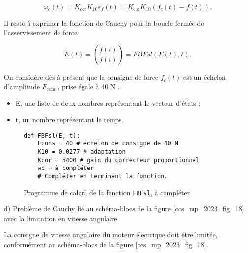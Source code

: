 $$
\omega_{c}(t)=K_{\operatorname{cor}} K_{10} \varepsilon_{f}(t)=K_{\operatorname{cor}} K_{10}\left(f_{c}(t)-f(t)\right) .
$$

Il reste à exprimer la fonction de Cauchy pour la boucle fermée de l'asservissement de force

$$
\dot{E}(t)=\binom{\dot{f}(t)}{\ddot{f}(t)}=F B F s l(E(t), t) .
$$

On considère dès à présent que la consigne de force $f_{c}(t)$ est un échelon d'amplitude $F_{\text {cons }}$, prise égale à 40 N .\\

\begin{itemize}
  \item E, une liste de deux nombres représentant le vecteur d'états ;
  \item t, un nombre représentant le temps.
\end{itemize}

\ifprof
\begin{corrige}
\end{corrige}
\else
\fi






\begin{figure}[!h]
\begin{lstlisting}
def FBFsl(E, t):
    Fcons = 40 # échelon de consigne de 40 N
    K10 = 0.0277 # adaptation
    Kcor = 5400 # gain du correcteur proportionnel
    wc = à compléter
    # Compléter en terminant la fonction.
\end{lstlisting}
\caption{\label{ccs_mp_2023_fig_19}  Programme de calcul de la fonction \lstinline{FBFsl}, à compléter}
\end{figure}


d) Problème de Cauchy lié au schéma-blocs de la figure \ref{ccs_mp_2023_fig_18} avec la limitation en vitesse angulaire

La consigne de vitesse angulaire du moteur électrique doit être limitée, conformément au schéma-blocs de la figure \ref{ccs_mp_2023_fig_18}.\\


\ifprof
\begin{corrige}
\end{corrige}
\else
\fi




